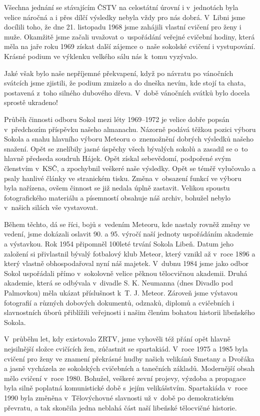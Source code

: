 \documentclass[a5paper, 11pt, twoside]{article}
\begin{document}
Všechna jednání se stávajícím ČSTV na celostátní úrovní i v~jednotách
byla velice náročná a i přes dílčí výsledky nebyla vždy pro nás dobrá.
V~Libni jsme docílili toho, že dne 21. listopadu 1968 jsme zahájili
vlastní cvičení pro ženy i muže. Okamžitě jsme začali uvažovat
o~uspořádání veřejné cvičební hodiny, která měla na jaře roku 1969 získat
další zájemce o~naše sokolské cvičení i vystupování. Krásné podium ve
výklenku velkého sálu nás k~tomu vyzývalo.

Jaké však bylo naše nepříjemné překvapení, když po návratu po vánočních
svátcích jsme zjistili, že podium zmizelo a do dneška nevím, kde stojí
ta chata, postavená z~toho silného dubového dřeva. V~době vánočních
svátků bylo docela sprostě ukradeno!

Průběh činnosti odboru Sokol mezi léty 1969--1972 je velice
dobře popsán v~předchozím příspěvku našeho almanachu. Názorně podává
těžkou pozici výboru Sokola a snahu hlavního výboru Meteoru o~znemožnění
dobrých výsledků našeho snažení. Opět se znelíbily jasné úspěchy všech
bývalých sokolů a zasadil se o~to hlavně předseda soudruh Hájek. Opět
získal sebevědomí, podpořené svým členstvím v~KSČ, a zpochybnil veškeré
naše výsledky. Opět se téměř vylučovalo a psaly hanlivé články ve
stranickém tisku. Změna v~obsazení funkcí ve výboru byla nařízena, ovšem
činnost se již nedala úplně zastavit. Velikou spoustu fotografického
materiálu a písemností obsahuje náš archiv, bohužel nebylo v~našich
silách vše vystavovat.

Během těchto, dá se říci, bojů s~vedením Meteoru, kde nastaly rovněž
změny ve vedení, jsme dokázali oslavit 90. a 95. výročí naší jednoty
uspořádáním akademie a výstavkou. Rok 1954 připomněl 100leté trvání
Sokola Libeň. Datum jeho založení si přivlastnil bývalý fotbalový klub
Meteor, který vznikl až v~roce 1896 a který vlastně obhospodařoval nyní
náš majetek. V~dubnu 1984 jsme jako odbor Sokol uspořádali přímo
v~sokolovně velice pěknou tělocvičnou akademii. Druhá akademie, která se
odbývala v~divadle S. K. Neumanna (dnes Divadlo pod Palmovkou) měla
ukázat příslušnost k~T. J. Meteor. Zároveň jsme výstavou fotografií a
různých dobových dokumentů, odznaků, diplomů a cvičebních i slavnostních
úborů přiblížili veřejnosti i našim členům bohatou historii libeňského
Sokola.

V~průběhu let, kdy existovalo ZRTV, jsme vyhověli též přání opět hlavně
nejsilnější složce cvičících žen, zúčastnit se spartakiád. V~roce 1975 a
1985 byla cvičení pro ženy ve znamení překrásné hudby našich velikánů
Smetany a Dvořáka a jasně vycházela ze sokolských cvičebních a tanečních
základů. Modernější obsah mělo cvičení v~roce 1980. Bohužel, veškeré
zevní projevy, výzdoba a propagace byla silně poplatná komunistické době
s~jejím velikášstvím. Spartakiáda v~roce 1990 byla změněna
v~Tělovýchovné slavnosti už v~době po demokratickém převratu, a tak
skončila jedna neblahá část naší libeňské tělocvičné historie.
\end{document}
